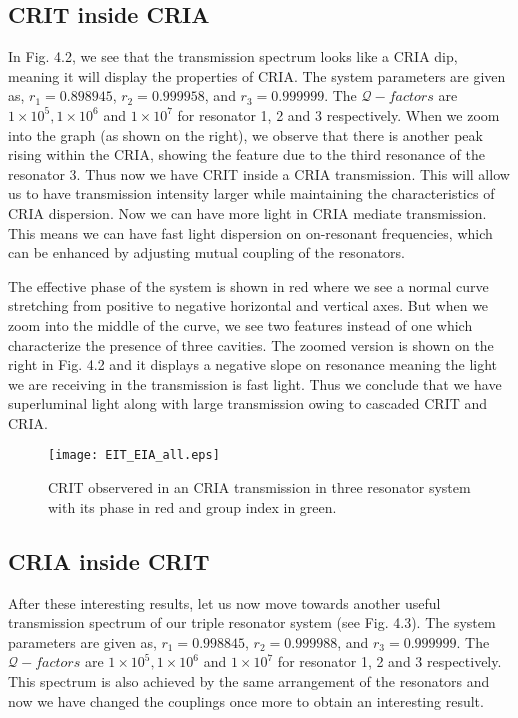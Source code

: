 \subsection{CRIT inside CRIA}
In Fig. 4.2, we see that the transmission spectrum looks like a CRIA dip, meaning it will display the properties of CRIA. The system parameters are given as, $r_{1} = 0.898945$, $r_{2} = 0.999958$, and $r_{3} = 0.999999$. The $\mathcal{Q}-factors$ are $1\times10^{5}, 1\times10^{6}$ and $1\times10^{7}$ for resonator 1, 2 and 3 respectively. When we zoom into the graph (as shown on the right), we observe that there is another peak rising within the CRIA, showing the feature due to the third resonance of the resonator 3. Thus now we have CRIT inside a CRIA transmission. This will allow us to have transmission intensity larger while maintaining the characteristics of CRIA dispersion. Now we can have more light in CRIA mediate transmission. This means we can have fast light dispersion on on-resonant frequencies, which can be enhanced by adjusting mutual coupling of the resonators.

The effective phase of the system is shown in red where we see a normal curve stretching from positive to negative horizontal and vertical axes. But when we zoom into the middle of the curve, we see two features instead of one which characterize the presence of three cavities. The zoomed version is shown on the right in Fig. 4.2 and it displays a negative slope on resonance meaning the light we are receiving in the transmission is fast light. Thus we conclude that we have superluminal light along with large transmission owing to cascaded CRIT and CRIA.

\begin{figure}[t]
\centering
\texttt{[image: EIT\_EIA\_all.eps]}
\caption{CRIT observered in an CRIA transmission in three resonator system with its phase in red and group index in green.}
\end{figure}

\newpage
\subsection{CRIA inside CRIT}

After these interesting results, let us now move towards another useful transmission spectrum of our triple resonator system (see Fig. 4.3). The system parameters are given as, $r_{1} = 0.998845$, $r_{2} = 0.999988$, and $r_{3} = 0.999999$. The $\mathcal{Q}-factors$ are $1\times10^{5}, 1\times10^{6}$ and $1\times10^{7}$ for resonator 1, 2 and 3 respectively. This spectrum is also achieved by the same arrangement of the resonators and now we have changed the couplings once more to obtain an interesting result. 

